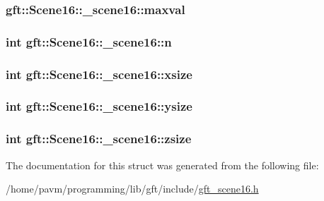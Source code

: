 \hypertarget{structgft_1_1Scene16_1_1__scene16_a9fc6ef1ab4186efec3a186393a261597}{
\subsubsection[{maxval}]{ gft\-::\-Scene16\-::\-\_\-scene16\-::maxval}}\label{structgft_1_1Scene16_1_1__scene16_a9fc6ef1ab4186efec3a186393a261597}
\hypertarget{structgft_1_1Scene16_1_1__scene16_a23fdfabcf912d8c2162aaa7cc6563ae9}{
\subsubsection[{n}]{\setlength{\rightskip}{0pt plus 5cm}int gft\-::\-Scene16\-::\-\_\-scene16\-::n}}\label{structgft_1_1Scene16_1_1__scene16_a23fdfabcf912d8c2162aaa7cc6563ae9}
\hypertarget{structgft_1_1Scene16_1_1__scene16_a8ae57178842d43cc00ac0a943559d567}{
\subsubsection[{xsize}]{\setlength{\rightskip}{0pt plus 5cm}int gft\-::\-Scene16\-::\-\_\-scene16\-::xsize}}\label{structgft_1_1Scene16_1_1__scene16_a8ae57178842d43cc00ac0a943559d567}
\hypertarget{structgft_1_1Scene16_1_1__scene16_a074635a9101766856f9c1925650017b9}{
\subsubsection[{ysize}]{\setlength{\rightskip}{0pt plus 5cm}int gft\-::\-Scene16\-::\-\_\-scene16\-::ysize}}\label{structgft_1_1Scene16_1_1__scene16_a074635a9101766856f9c1925650017b9}
\hypertarget{structgft_1_1Scene16_1_1__scene16_a23459fd3e8f2a3b1a9fd973cd9cc672c}{
\subsubsection[{zsize}]{\setlength{\rightskip}{0pt plus 5cm}int gft\-::\-Scene16\-::\-\_\-scene16\-::zsize}}\label{structgft_1_1Scene16_1_1__scene16_a23459fd3e8f2a3b1a9fd973cd9cc672c}


The documentation for this struct was generated from the following file\-:\begin{DoxyCompactItemize}
\item 
/home/pavm/programming/lib/gft/include/\hyperlink{gft__scene16_8h}{gft\-\_\-scene16.\-h}\end{DoxyCompactItemize}
